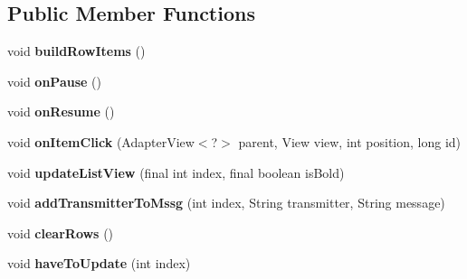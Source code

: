 \subsection*{Public Member Functions}
\begin{DoxyCompactItemize}
\item 
void {\bfseries build\+Row\+Items} ()\hypertarget{classcom_1_1example_1_1sebastian_1_1tindertp_1_1ChatListActivity_afe504e3c7bcb0c9cafcab54c15e089ad}{}\label{classcom_1_1example_1_1sebastian_1_1tindertp_1_1ChatListActivity_afe504e3c7bcb0c9cafcab54c15e089ad}

\item 
void {\bfseries on\+Pause} ()\hypertarget{classcom_1_1example_1_1sebastian_1_1tindertp_1_1ChatListActivity_aa895d489fd054489fc2d906e85dcf854}{}\label{classcom_1_1example_1_1sebastian_1_1tindertp_1_1ChatListActivity_aa895d489fd054489fc2d906e85dcf854}

\item 
void {\bfseries on\+Resume} ()\hypertarget{classcom_1_1example_1_1sebastian_1_1tindertp_1_1ChatListActivity_ad1ecd395258d9109c64c92613a5762ab}{}\label{classcom_1_1example_1_1sebastian_1_1tindertp_1_1ChatListActivity_ad1ecd395258d9109c64c92613a5762ab}

\item 
void {\bfseries on\+Item\+Click} (Adapter\+View$<$?$>$ parent, View view, int position, long id)\hypertarget{classcom_1_1example_1_1sebastian_1_1tindertp_1_1ChatListActivity_a8e8ef25c30fcbe13f691da38f4217e28}{}\label{classcom_1_1example_1_1sebastian_1_1tindertp_1_1ChatListActivity_a8e8ef25c30fcbe13f691da38f4217e28}

\item 
void {\bfseries update\+List\+View} (final int index, final boolean is\+Bold)\hypertarget{classcom_1_1example_1_1sebastian_1_1tindertp_1_1ChatListActivity_a8de4034f203ac8941f3073f1b28d87be}{}\label{classcom_1_1example_1_1sebastian_1_1tindertp_1_1ChatListActivity_a8de4034f203ac8941f3073f1b28d87be}

\item 
void {\bfseries add\+Transmitter\+To\+Mssg} (int index, String transmitter, String message)\hypertarget{classcom_1_1example_1_1sebastian_1_1tindertp_1_1ChatListActivity_ab659604d353e809c1e12d72053e920a1}{}\label{classcom_1_1example_1_1sebastian_1_1tindertp_1_1ChatListActivity_ab659604d353e809c1e12d72053e920a1}

\item 
void {\bfseries clear\+Rows} ()\hypertarget{classcom_1_1example_1_1sebastian_1_1tindertp_1_1ChatListActivity_aa294e0a521a22f21393d29d1840aa3c3}{}\label{classcom_1_1example_1_1sebastian_1_1tindertp_1_1ChatListActivity_aa294e0a521a22f21393d29d1840aa3c3}

\item 
void {\bfseries have\+To\+Update} (int index)\hypertarget{classcom_1_1example_1_1sebastian_1_1tindertp_1_1ChatListActivity_aea48a7b0905e33ebca450dd364105196}{}\label{classcom_1_1example_1_1sebastian_1_1tindertp_1_1ChatListActivity_aea48a7b0905e33ebca450dd364105196}

\end{DoxyCompactItemize}
